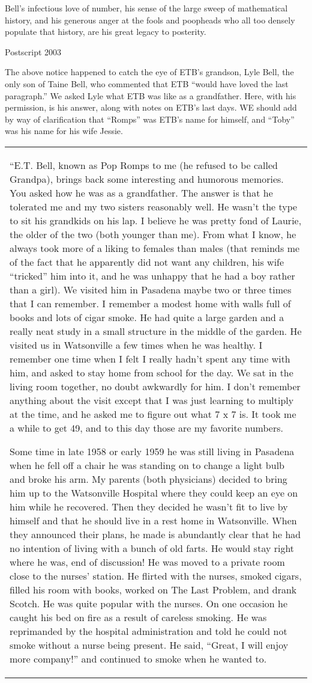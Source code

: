 \documentclass[10pt,letter]{article}
\renewenvironment{quote}
  {\begin{tabular}{|p{13cm}}}
  {\end{tabular}}
\begin{document}
Bell's infectious love of number, his sense of the large sweep of
mathematical history, and his generous anger at the fools and poopheads
who all too densely populate that history, are his great legacy to
posterity.

Postscript 2003

The above notice happened to catch the eye of ETB's grandson, Lyle Bell,
the only son of Taine Bell, who commented that ETB ``would have loved
the last paragraph.'' We asked Lyle what ETB was like as a grandfather.
Here, with his permission, is his answer, along with notes on ETB's last
days. WE should add by way of clarification that ``Romps'' was ETB's
name for himself, and ``Toby'' was his name for his wife Jessie.
\begin{quote}
``E.T. Bell, known as Pop Romps to me (he refused to be called Grandpa),
brings back some interesting and humorous memories. You asked how he was
as a grandfather. The answer is that he tolerated me and my two sisters
reasonably well. He wasn't the type to sit his grandkids on his lap. I
believe he was pretty fond of Laurie, the older of the two (both younger
than me). From what I know, he always took more of a liking to females
than males (that reminds me of the fact that he apparently did not want
any children, his wife ``tricked'' him into it, and he was unhappy that
he had a boy rather than a girl). We visited him in Pasadena maybe two
or three times that I can remember. I remember a modest home with walls
full of books and lots of cigar smoke. He had quite a large garden and a
really neat study in a small structure in the middle of the garden. He
visited us in Watsonville a few times when he was healthy. I remember
one time when I felt I really hadn't spent any time with him, and asked
to stay home from school for the day. We sat in the living room
together, no doubt awkwardly for him. I don't remember anything about
the visit except that I was just learning to multiply at the time, and
he asked me to figure out what 7 x 7 is. It took me a while to get 49,
and to this day those are my favorite numbers.

Some time in late 1958 or early 1959 he was still living in Pasadena
when he fell off a chair he was standing on to change a light bulb and
broke his arm. My parents (both physicians) decided to bring him up to
the Watsonville Hospital where they could keep an eye on him while he
recovered. Then they decided he wasn't fit to live by himself and that
he should live in a rest home in Watsonville. When they announced their
plans, he made is abundantly clear that he had no intention of living
with a bunch of old farts. He would stay right where he was, end of
discussion! He was moved to a private room close to the nurses' station.
He flirted with the nurses, smoked cigars, filled his room with books,
worked on The Last Problem, and drank Scotch. He was quite popular with
the nurses. On one occasion he caught his bed on fire as a result of
careless smoking. He was reprimanded by the hospital administration and
told he could not smoke without a nurse being present. He said, ``Great,
I will enjoy more company!'' and continued to smoke when he wanted to.


\end{quote}
\end{document}
